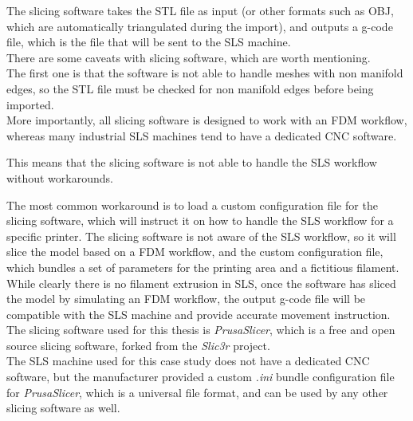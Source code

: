 \documentclass{article}
\begin{document}
          The slicing software takes the STL file as input (or other formats such as OBJ, which are
          automatically triangulated during the import), and outputs a g-code file, which is the file that will be sent to the SLS machine. \\
  
          There are some caveats with slicing software, which are worth mentioning. \\
  
          The first one is that the software is not able to handle meshes with non manifold edges, so 
          the STL file must be checked for non manifold edges before being imported. \\ 
  
          More importantly, all slicing software is designed to work with an FDM workflow, whereas 
          many industrial SLS machines tend to have a dedicated CNC software. 
  
          This means that the slicing software is not able to handle the SLS workflow without workarounds. 
  
          The most common workaround is to load a custom configuration file for the slicing software, 
          which will instruct it on how to handle the SLS workflow for a specific printer. 
          The slicing software is not aware of the SLS workflow, so it will slice the model 
          based on a FDM workflow, and the custom configuration file, which bundles a set of 
          parameters for the printing area and a fictitious filament. \\ 
  
          While clearly there is no filament extrusion in SLS, once the software has sliced the model by simulating 
          an FDM workflow, the output g-code file will be compatible with the SLS machine and provide 
          accurate movement instruction. \\
  
          The slicing software used for this thesis is \textit{PrusaSlicer}, 
          which is a free and open source slicing software, forked from the \textit{Slic3r} project. \\
  
          The SLS machine used for this case study does not have a dedicated CNC software, but the 
          manufacturer provided a custom \textit{.ini} bundle configuration file for \textit{PrusaSlicer}, which is
          a universal file format, and can be used by any other slicing software as well. \\
          
\end{document}
